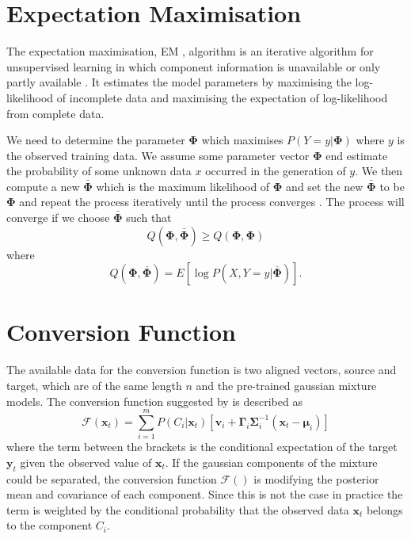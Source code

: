 \section{Expectation Maximisation} %
\label{sec:expectation_maximisation}
The expectation maximisation, EM , algorithm is an iterative algorithm for unsupervised learning in which component information is unavailable or only partly available \cite{taletek}. It estimates the model parameters by maximising the log-likelihood of incomplete data and maximising the expectation of log-likelihood from complete data.

We need to determine the parameter $\mathbf{\Phi}$ which maximises $P(Y=y\vert \mathbf{\Phi})$ where $y$ is the observed training data. We assume some parameter vector $\mathbf{\Phi}$ end estimate the probability of some unknown data $x$ occurred in the generation of $y$. We then compute a new $\bar{\mathbf{\Phi}}$ which is the maximum likelihood of $\mathbf{\Phi}$ and set the new $\bar{\mathbf{\Phi}}$ to be $\mathbf{\Phi}$ and repeat the process iteratively until the process converges \cite{taletek}. The process will converge if we choose $\bar{\mathbf{\Phi}}$ such that 
\begin{equation}
	\label{eq:q_criteria}
	Q(\mathbf{\Phi},\bar{\mathbf{\Phi}})\geq Q(\mathbf{\Phi},\mathbf{\Phi})
\end{equation}
where 
\begin{equation}
	\label{eq:q_function}
	Q(\mathbf{\Phi},\bar{\mathbf{\Phi}}) = E[\log P(X,Y=y\vert \bar{\mathbf{\Phi}})].
\end{equation}


\section{Conversion Function} %
\label{sec:conversion_function}
The available data for the conversion function is two aligned vectors, source and target, which are of the same length $n$ and the pre-trained gaussian mixture models. The conversion function suggested by \cite{stylianou95} is described as
\begin{equation}
	\label{eq:conversion_function}
	\mathcal{F}(\mathbf{x}_t) = \sum_{i=1}^{m}P(C_i \vert \mathbf{x}_t)[\mathbf{v}_i + \boldsymbol{\Gamma}_i \mathbf{\Sigma}_i^{-1}(\mathbf{x}_t-\boldsymbol{\mu}_i)]
\end{equation}
where the term between the brackets is the conditional expectation of the target $\mathbf{y}_t$ given the observed value of $\mathbf{x}_t$. If the gaussian components of the mixture could be separated, the conversion function $\mathcal{F}()$ is modifying the posterior mean and covariance of each component. Since this is not the case in practice the term is weighted by the conditional probability that the observed data $\mathbf{x}_t$ belongs to the component $C_i$.

